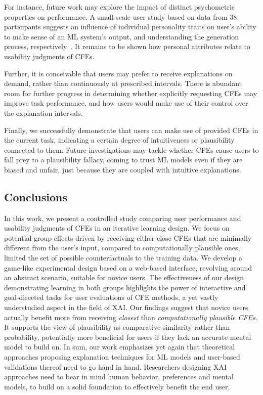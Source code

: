 For instance, future work may explore the impact of distinct psychometric properties on performance. 
A small-scale user study based on data from 38 participants suggests an influence of individual personality traits on user's ability to make sense of an \gls{ML} system's output, and understanding the generation process, respectively~\citep{gleaves_role_2020}.
It remains to be shown how personal attributes relate to usability judgments of \glspl{CFE}.

Further, it is conceivable that users may prefer to receive explanations on demand, rather than continuously at prescribed intervals.
There is abundant room for further progress in determining whether explicitly requesting \glspl{CFE} may improve task performance, and how users would make use of their control over the explanation intervals.

Finally, we successfully demonstrate that users can make use of provided \glspl{CFE} in the current task, indicating a certain degree of intuitiveness or plausibility connected to them. 
Future investigations may tackle whether \glspl{CFE} cause users to fall prey to a plausibility fallacy, coming to trust ML models even if they are biased and unfair, just because they are coupled with intuitive explanations.

\subsection{Conclusions}\label{subsec:conclusion}
In this work, we present a controlled study comparing user performance and usability judgments of \glspl{CFE} in an iterative learning design.
We focus on potential group effects driven by receiving either close \glspl{CFE} that are minimally different from the user's input, compared to computationally plausible ones, limited the set of possible counterfactuals to the training data.
We develop a game-like experimental design based on a web-based interface, revolving around an abstract scenario, suitable for novice users.
The effectiveness of our design demonstrating learning in both groups highlights the power of interactive and goal-directed tasks for user evaluations of \gls{CFE} methods, a yet vastly understudied aspect in the field of \gls{XAI}.
Our findings suggest that novice users actually benefit more from receiving \textit{closest} than \textit{computationally plausible \glspl{CFE}}.
It supports the view of plausibility as comparative similarity rather than probability, potentially more beneficial for users if they lack an accurate mental model to build on.
In sum, our work emphasizes yet again that theoretical approaches proposing explanation techniques for \gls{ML} models and user-based validations thereof need to go hand in hand.
Researchers designing \gls{XAI} approaches need to bear in mind human behavior, preferences and mental models, to build on a solid foundation to effectively benefit the end user.

